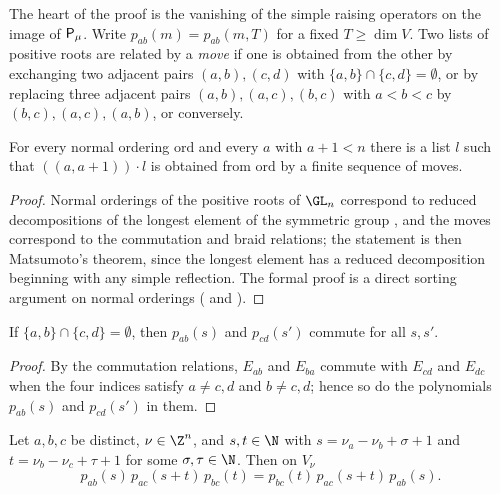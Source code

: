 The heart of the proof is the vanishing of the simple raising operators on the image of $\mathsf P_\mu$. Write
$p_{ab}(m)=p_{ab}(m,T)$ for a fixed $T\ge\dim V$. Two lists of positive roots are related by a \emph{move} if one is
obtained from the other by exchanging two adjacent pairs $(a,b),(c,d)$ with $\{a,b\}\cap\{c,d\}=\emptyset$, or by replacing
three adjacent pairs $(a,b),(a,c),(b,c)$ with $a<b<c$ by $(b,c),(a,c),(a,b)$, or conversely.

\begin{lemma}\label{pf:sh-curv:conn}
For every normal ordering $\mathrm{ord}$ and every $a$ with $a+1<n$ there is a list $l$ such that $((a,a+1))\cdot l$ is
obtained from $\mathrm{ord}$ by a finite sequence of moves.
\end{lemma}

\begin{proof}
Normal orderings of the positive roots of $\GL_n$ correspond to reduced decompositions of the longest element of the
symmetric group \cite{Zhelobenko1989}, and the moves correspond to the commutation and braid relations; the statement is
then Matsumoto's theorem, since the longest element has a reduced decomposition beginning with any simple reflection. The
formal proof is a direct sorting argument on normal orderings
( and ).
\end{proof}

\begin{lemma}\label{pf:sh-curv:comm}
If $\{a,b\}\cap\{c,d\}=\emptyset$, then $p_{ab}(s)$ and $p_{cd}(s')$ commute for all $s,s'$.
\end{lemma}

\begin{proof}
By the commutation relations, $E_{ab}$ and $E_{ba}$ commute with $E_{cd}$ and $E_{dc}$ when the four indices satisfy
$a\ne c,d$ and $b\ne c,d$; hence so do the polynomials $p_{ab}(s)$ and $p_{cd}(s')$ in them.
\end{proof}

\begin{lemma}\label{pf:sh-curv:yb}
Let $a,b,c$ be distinct, $\nu\in\Z^n$, and $s,t\in\N$ with $s=\nu_a-\nu_b+\sigma+1$ and $t=\nu_b-\nu_c+\tau+1$ for some
$\sigma,\tau\in\N$. Then on $V_\nu$
\[
p_{ab}(s)\,p_{ac}(s+t)\,p_{bc}(t)=p_{bc}(t)\,p_{ac}(s+t)\,p_{ab}(s).
\]
\end{lemma}

